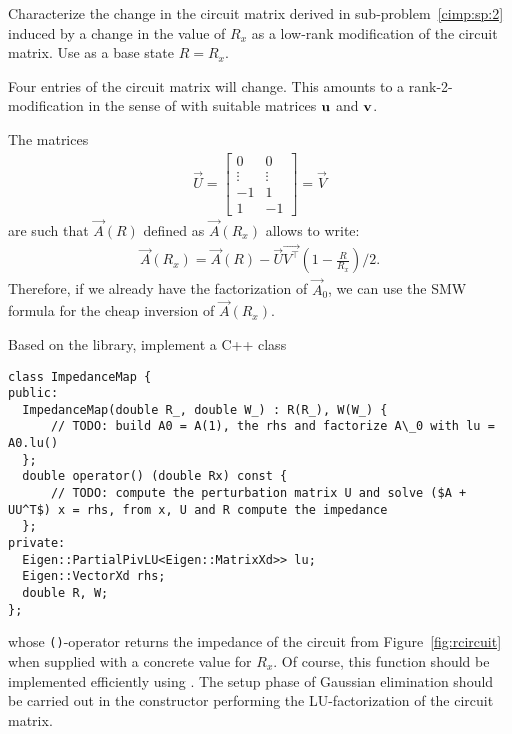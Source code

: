 \begin{problem}
\begin{subproblem}[3]
\end{subproblem}

\begin{subproblem}[3]\label{cimp:sp:3}
  Characterize the change in the circuit matrix derived in
  sub-problem~\ref{cimp:sp:2} induced by a change in the value of $R_{x}$ 
  as a low-rank modification of the circuit matrix. Use as a base state $R = R_x$.

  \begin{hint}
    Four entries of the circuit matrix will change. This amounts to
    a rank-2-modification in the sense of  with suitable
    matrices ${\mathbf{u}}$ and ${\mathbf{v}}$. 
  \end{hint}
  
  \begin{solution}
   The matrices
   \begin{align*}
    \vec{U} = \begin{bmatrix}
               0 & 0 \\
               \vdots & \vdots \\
               -1 & 1 \\
               1 & -1
              \end{bmatrix} = \vec{V}
   \end{align*}
   are such that $\vec{A}(R)$ defined as $\vec{A}(R_x)$ allows to write:
   \begin{align*}
    \vec{A}(R_x) = \vec{A}(R) - \vec{U} \vec{V^\top} \left(1 - \frac{R}{R_x} \right) / {2}.
   \end{align*}
   Therefore, if we already have the factorization of $\vec{A}_0$, we can use the SMW formula for the cheap inversion of $\vec{A}(R_x)$.
\end{solution}

\end{subproblem}

\begin{subproblem}[3]
  Based on the \eigen{} library, implement a C++ class 
\begin{lstlisting}[style=cppsimple]
class ImpedanceMap {
public:
  ImpedanceMap(double R_, double W_) : R(R_), W(W_) {
      // TODO: build A0 = A(1), the rhs and factorize A\_0 with lu = A0.lu()
  };
  double operator() (double Rx) const {
      // TODO: compute the perturbation matrix U and solve ($A + UU^T$) x = rhs, from x, U and R compute the impedance
  };
private:
  Eigen::PartialPivLU<Eigen::MatrixXd>> lu;
  Eigen::VectorXd rhs;
  double R, W;
};   
\end{lstlisting}
whose \texttt{()}-operator returns the impedance of the circuit from 
Figure~\ref{fig:rcircuit} when supplied with a concrete value for $R_{x}$.
Of course, this function should be implemented efficiently using 
. The setup phase of Gaussian elimination should be carried
out in the constructor performing the LU-factorization of the circuit matrix.


\end{subproblem}
\end{problem}
